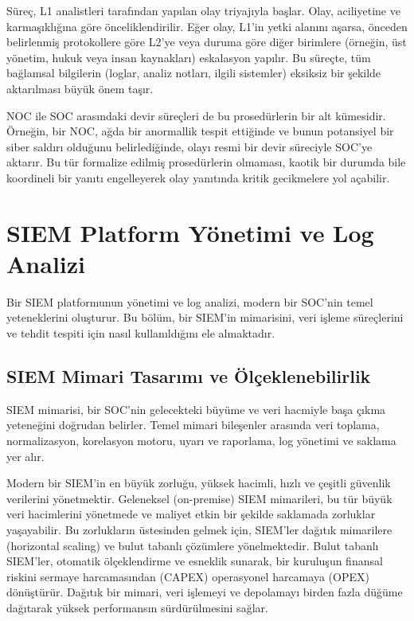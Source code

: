 Süreç, L1 analistleri tarafından yapılan olay triyajıyla başlar. Olay, aciliyetine ve karmaşıklığına göre önceliklendirilir. Eğer olay, L1'in yetki alanını aşarsa, önceden belirlenmiş protokollere göre L2'ye veya duruma göre diğer birimlere (örneğin, üst yönetim, hukuk veya insan kaynakları) eskalasyon yapılır. Bu süreçte, tüm bağlamsal bilgilerin (loglar, analiz notları, ilgili sistemler) eksiksiz bir şekilde aktarılması büyük önem taşır.

NOC ile SOC arasındaki devir süreçleri de bu prosedürlerin bir alt kümesidir. Örneğin, bir NOC, ağda bir anormallik tespit ettiğinde ve bunun potansiyel bir siber saldırı olduğunu belirlediğinde, olayı resmi bir devir süreciyle SOC'ye aktarır. Bu tür formalize edilmiş prosedürlerin olmaması, kaotik bir durumda bile koordineli bir yanıtı engelleyerek olay yanıtında kritik gecikmelere yol açabilir.

\section{SIEM Platform Yönetimi ve Log Analizi}

Bir SIEM platformunun yönetimi ve log analizi, modern bir SOC'nin temel yeteneklerini oluşturur. Bu bölüm, bir SIEM'in mimarisini, veri işleme süreçlerini ve tehdit tespiti için nasıl kullanıldığını ele almaktadır.

\subsection{SIEM Mimari Tasarımı ve Ölçeklenebilirlik}

SIEM mimarisi, bir SOC'nin gelecekteki büyüme ve veri hacmiyle başa çıkma yeteneğini doğrudan belirler. Temel mimari bileşenler arasında veri toplama, normalizasyon, korelasyon motoru, uyarı ve raporlama, log yönetimi ve saklama yer alır.

Modern bir SIEM'in en büyük zorluğu, yüksek hacimli, hızlı ve çeşitli güvenlik verilerini yönetmektir. Geleneksel (on-premise) SIEM mimarileri, bu tür büyük veri hacimlerini yönetmede ve maliyet etkin bir şekilde saklamada zorluklar yaşayabilir. Bu zorlukların üstesinden gelmek için, SIEM'ler dağıtık mimarilere (horizontal scaling) ve bulut tabanlı çözümlere yönelmektedir. Bulut tabanlı SIEM'ler, otomatik ölçeklendirme ve esneklik sunarak, bir kuruluşun finansal riskini sermaye harcamasından (CAPEX) operasyonel harcamaya (OPEX) dönüştürür. Dağıtık bir mimari, veri işlemeyi ve depolamayı birden fazla düğüme dağıtarak yüksek performansın sürdürülmesini sağlar.

